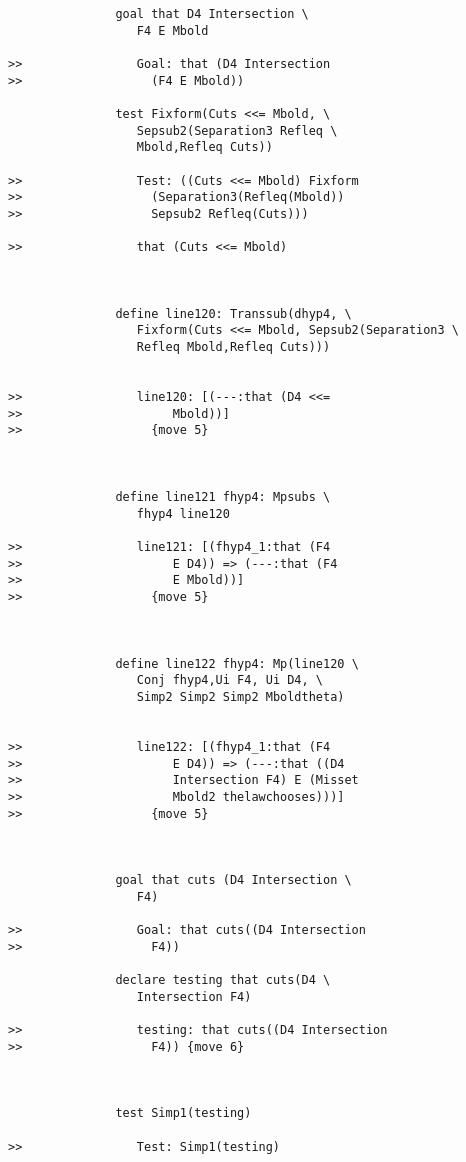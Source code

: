 \documentclass[12pt]{article}
\begin{document}
\begin{verbatim}
               goal that D4 Intersection \
                  F4 E Mbold

>>                Goal: that (D4 Intersection
>>                  (F4 E Mbold))

               test Fixform(Cuts <<= Mbold, \
                  Sepsub2(Separation3 Refleq \
                  Mbold,Refleq Cuts))

>>                Test: ((Cuts <<= Mbold) Fixform
>>                  (Separation3(Refleq(Mbold))
>>                  Sepsub2 Refleq(Cuts)))

>>                that (Cuts <<= Mbold)



               define line120: Transsub(dhyp4, \
                  Fixform(Cuts <<= Mbold, Sepsub2(Separation3 \
                  Refleq Mbold,Refleq Cuts)))


>>                line120: [(---:that (D4 <<=
>>                     Mbold))]
>>                  {move 5}



               define line121 fhyp4: Mpsubs \
                  fhyp4 line120

>>                line121: [(fhyp4_1:that (F4
>>                     E D4)) => (---:that (F4
>>                     E Mbold))]
>>                  {move 5}



               define line122 fhyp4: Mp(line120 \
                  Conj fhyp4,Ui F4, Ui D4, \
                  Simp2 Simp2 Simp2 Mboldtheta)


>>                line122: [(fhyp4_1:that (F4
>>                     E D4)) => (---:that ((D4
>>                     Intersection F4) E (Misset
>>                     Mbold2 thelawchooses)))]
>>                  {move 5}



               goal that cuts (D4 Intersection \
                  F4)

>>                Goal: that cuts((D4 Intersection
>>                  F4))

               declare testing that cuts(D4 \
                  Intersection F4)

>>                testing: that cuts((D4 Intersection
>>                  F4)) {move 6}



               test Simp1(testing)

>>                Test: Simp1(testing)


\end{verbatim}
\end{document}
